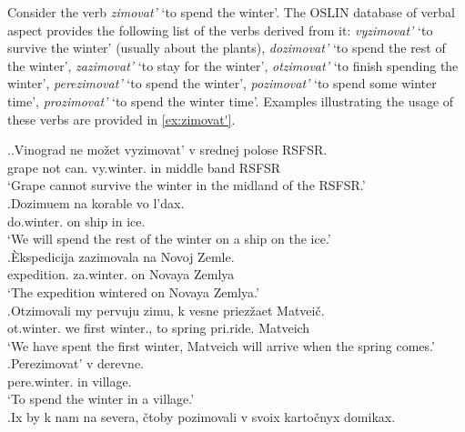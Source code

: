 Consider the verb \textit{zimovat'} `to spend the winter'. The OSLIN database of verbal aspect provides the following list of the verbs derived from it: \textit{vyzimovat'} `to survive the winter' (usually about the plants), \textit{dozimovat'} `to spend the rest of the winter', \textit{zazimovat'} `to stay for the winter', \textit{otzimovat'} `to finish spending the winter', \textit{perezimovat'} `to spend the winter', \textit{pozimovat'} `to spend some winter time', \textit{prozimovat'} `to spend the winter time'. Examples illustrating the usage of these verbs are provided in \ref{ex:zimovat'}.

\ex.\label{ex:zimovat'}\ag.\label{ex:vyzimovat'}Vinograd ne mo\v{z}et vyzimovat' v srednej polose RSFSR.\\
grape not can. vy.winter. in middle band RSFSR\\
\trans `Grape cannot survive the winter in the midland of the RSFSR.'\\
\bg.\label{ex:dozimovat'}Dozimuem na korable vo l'dax.\\
do.winter. on ship in ice.\\
\trans `We will spend the rest of the winter on a ship on the ice.'\\
\bg.\label{ex:zazimovat'}\`{E}kspedicija zazimovala na Novoj Zemle.\\
expedition. za.winter. on Novaya Zemlya\\
\trans `The expedition wintered on Novaya Zemlya.'\\
\bg.\label{ex:otzimovat'}Otzimovali my pervuju zimu, k vesne priez\v{z}aet Matvei\v{c}.\\
ot.winter. we first winter., to spring pri.ride. Matveich\\
\trans `We have spent the first winter, Matveich will arrive when the spring comes.'
\bg.\label{ex:perezimovat'}Perezimovat' v derevne.\\
pere.winter. in village.\\
\trans `To spend the winter in a village.'\\
\bg.\label{ex:pozimovat'}Ix by k nam na severa, \v{c}toby pozimovali v svoix karto\v{c}nyx domikax.\\
